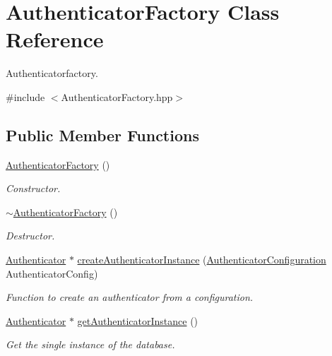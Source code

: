 \hypertarget{classAuthenticatorFactory}{
\section{AuthenticatorFactory Class Reference}
\label{classAuthenticatorFactory}
}


Authenticatorfactory.  




{\ttfamily \#include $<$AuthenticatorFactory.hpp$>$}

\subsection*{Public Member Functions}
\begin{DoxyCompactItemize}
\item 
\hypertarget{classAuthenticatorFactory_a1c9cea95a2b6d639eb893d24bdc25aa1}{
\hyperlink{classAuthenticatorFactory_a1c9cea95a2b6d639eb893d24bdc25aa1}{AuthenticatorFactory} ()}
\label{classAuthenticatorFactory_a1c9cea95a2b6d639eb893d24bdc25aa1}

\begin{DoxyCompactList}\small\item\em Constructor. \item\end{DoxyCompactList}\item 
\hypertarget{classAuthenticatorFactory_ae6bd75da1a761daaeb06defa1c7c3bdd}{
\hyperlink{classAuthenticatorFactory_ae6bd75da1a761daaeb06defa1c7c3bdd}{$\sim$AuthenticatorFactory} ()}
\label{classAuthenticatorFactory_ae6bd75da1a761daaeb06defa1c7c3bdd}

\begin{DoxyCompactList}\small\item\em Destructor. \item\end{DoxyCompactList}\item 
\hyperlink{classAuthenticator}{Authenticator} $\ast$ \hyperlink{classAuthenticatorFactory_a6c8275635615e09420d4ba04c6d7bd61}{createAuthenticatorInstance} (\hyperlink{classAuthenticatorConfiguration}{AuthenticatorConfiguration} AuthenticatorConfig)
\begin{DoxyCompactList}\small\item\em Function to create an authenticator from a configuration. \item\end{DoxyCompactList}\item 
\hyperlink{classAuthenticator}{Authenticator} $\ast$ \hyperlink{classAuthenticatorFactory_a7464e6bb428e1e6d3929fc5fa15fa5c7}{getAuthenticatorInstance} ()
\begin{DoxyCompactList}\small\item\em Get the single instance of the database. \item\end{DoxyCompactList}\end{DoxyCompactItemize}
